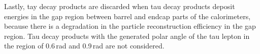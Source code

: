Lastly, tay decay products are discarded when tau decay products deposit energies in the gap region between barrel and  endcap parts of the calorimeters, because there is a degradation in the particle reconstruction efficiency in the gap region. Tau decay products with the generated polar angle of the tau lepton in the region of 0.6\,rad and 0.9\,rad are not considered.













